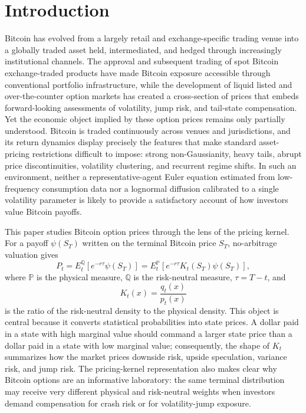 \section{Introduction}

Bitcoin has evolved from a largely retail and exchange-specific trading venue into a globally traded asset held, intermediated, and hedged through increasingly institutional channels. The approval and subsequent trading of spot Bitcoin exchange-traded products have made Bitcoin exposure accessible through conventional portfolio infrastructure, while the development of liquid listed and over-the-counter option markets has created a cross-section of prices that embeds forward-looking assessments of volatility, jump risk, and tail-state compensation. Yet the economic object implied by these option prices remains only partially understood. Bitcoin is traded continuously across venues and jurisdictions, and its return dynamics display precisely the features that make standard asset-pricing restrictions difficult to impose: strong non-Gaussianity, heavy tails, abrupt price discontinuities, volatility clustering, and recurrent regime shifts. In such an environment, neither a representative-agent Euler equation estimated from low-frequency consumption data nor a lognormal diffusion calibrated to a single volatility parameter is likely to provide a satisfactory account of how investors value Bitcoin payoffs.

{\color{red}This paper studies Bitcoin option prices through the lens of the pricing kernel. For a payoff $\psi(S_T)$ written on the terminal Bitcoin price $S_T$, no-arbitrage valuation gives
\begin{equation}
P_t=E_t^\mathbb{Q}\left[e^{-r\tau}\psi(S_T)\right]
    =E_t^\mathbb{P}\left[e^{-r\tau}K_t(S_T)\psi(S_T)\right],
\end{equation}
where $\mathbb{P}$ is the physical measure, $\mathbb{Q}$ is the risk-neutral measure, $\tau=T-t$, and
\begin{equation}    
K_t(x)=\frac{q_t(x)}{p_t(x)}
\end{equation}
is the ratio of the risk-neutral density to the physical density.} This object is central because it converts statistical probabilities into state prices. A dollar paid in a state with high marginal value should command a larger state price than a dollar paid in a state with low marginal value; consequently, the shape of $K_t$ summarizes how the market prices downside risk, upside speculation, variance risk, and jump risk. The pricing-kernel representation also makes clear why Bitcoin options are an informative laboratory: the same terminal distribution may receive very different physical and risk-neutral weights when investors demand compensation for crash risk or for volatility-jump exposure.

